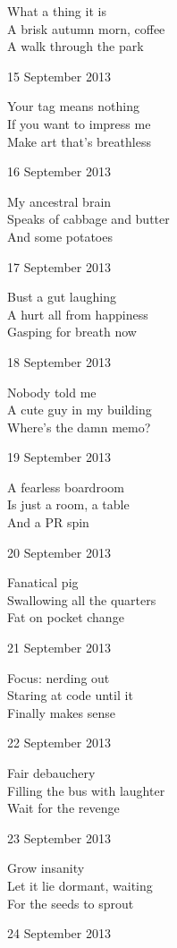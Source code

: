 \documentclass[12pt]{article}
\begin{document}
What a thing it is \\
A brisk autumn morn, coffee \\
A walk through the park

15 September 2013

Your tag means nothing \\
If you want to impress me \\
Make art that's breathless

16 September 2013

My ancestral brain \\
Speaks of cabbage and butter \\
And some potatoes

\newpage

17 September 2013

Bust a gut laughing \\
A hurt all from happiness \\
Gasping for breath now

18 September 2013

Nobody told me \\
A cute guy in my building \\
Where's the damn memo?

19 September 2013

A fearless boardroom \\
Is just a room, a table \\
And a PR spin

20 September 2013

Fanatical pig \\
Swallowing all the quarters \\
Fat on pocket change

21 September 2013

Focus: nerding out \\
Staring at code until it \\
Finally makes sense

22 September 2013

Fair debauchery \\
Filling the bus with laughter \\
Wait for the revenge

23 September 2013

Grow insanity \\
Let it lie dormant, waiting  \\
For the seeds to sprout

\newpage

24 September 2013
\end{document}
